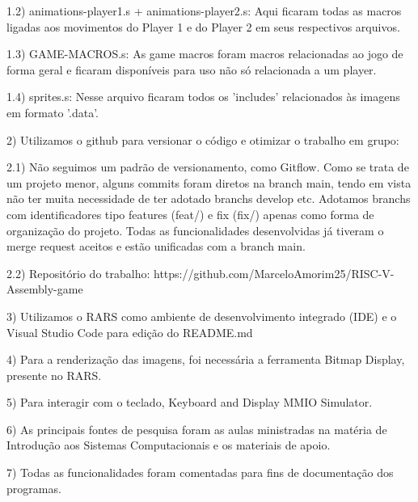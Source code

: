 \documentclass[a4paper]{sbgames}
\begin{document}
1.2) animations-player1.s + animations-player2.s: Aqui ficaram todas as macros ligadas aos movimentos do Player 1 e do Player 2 em seus respectivos arquivos.
	
1.3) GAME-MACROS.s: As game macros foram macros relacionadas ao jogo de forma geral e ficaram disponíveis para uso não só relacionada a um player.

1.4) sprites.s: Nesse arquivo ficaram todos os 'includes' relacionados às imagens em formato '.data'.


2) Utilizamos o github para versionar o código e otimizar o trabalho em grupo:

2.1) Não seguimos um padrão de versionamento, como Gitflow. Como se trata de um projeto menor, alguns commits foram diretos na branch main, tendo em vista não ter muita necessidade de ter adotado branchs develop etc. Adotamos branchs com identificadores tipo features (feat/) e fix (fix/) apenas como forma de organização do projeto. Todas as funcionalidades desenvolvidas já tiveram o merge request aceitos e estão unificadas com a branch main.

2.2) Repositório do trabalho: https://github.com/MarceloAmorim25/RISC-V-Assembly-game
 
 	 
3) Utilizamos o RARS como ambiente de desenvolvimento integrado (IDE) e o Visual Studio Code para edição do README.md
 
4) Para a renderização das imagens, foi necessária a ferramenta Bitmap Display, presente no RARS.
 
5) Para interagir com o teclado, Keyboard and Display MMIO Simulator.
 
6) As principais fontes de pesquisa foram as aulas ministradas na matéria de Introdução aos Sistemas Computacionais e os materiais de apoio.

7) Todas as funcionalidades foram comentadas para fins de documentação dos programas.


\textbf{}
\end{document}
